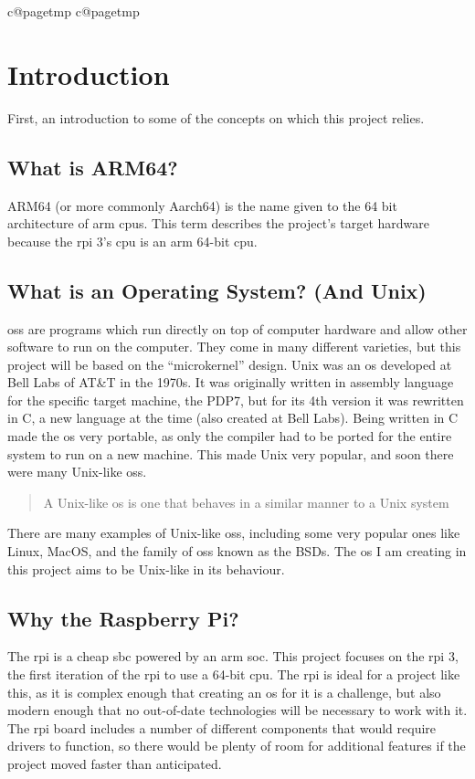 \documentclass{article}
\makeatletter
\newcommand{\mypagenumbering}[1]{%
    \ifcsname c@pagetmp\endcsname
    \else
        \newcounter{pagetmp}
    \fi
    \setcounter{pagetmp}{\value{page}}
    \pagenumbering{#1}
    \setcounter{page}{\value{pagetmp}}
}
\makeatother
\begin{document}
{\mypagenumbering{roman}\hypersetup{hidelinks} \tableofcontents}
\clearpage
\mypagenumbering{arabic}

\section{Introduction}
First, an introduction to some of the concepts on which this project relies.

\subsection{What is ARM64?}
ARM64 (or more commonly Aarch64) is the name given to the 64 bit architecture
of \gls{arm} \glspl{cpu}. This term describes the project's target hardware
because the \gls{rpi} 3's \gls{cpu} is an \gls{arm} 64-bit \gls{cpu}.

\subsection{What is an Operating System? (And Unix)}
\glspl{os} are programs which run directly on top of computer hardware and
allow other software to run on the computer. They come in many different
varieties, but this project will be based on the ``microkernel'' design. Unix
was an \gls{os} developed at Bell Labs of AT\&T in the 1970s. It was originally
written in assembly language for the specific target machine, the PDP7, but for
its 4th version it was rewritten in C, a new language at the time (also created
at Bell Labs). Being written in C made the \gls{os} very portable, as only the
compiler had to be ported for the entire system to run on a new machine. This
made Unix very popular, and soon there were many Unix-like \glspl{os}.
\blockquote[\cite{unix-like}]{A Unix-like \gls{os} is one that behaves in a
similar manner to a Unix system}.
There are many examples of Unix-like \glspl{os}, including some very popular
ones like Linux, MacOS, and the family of \glspl{os} known as the BSDs. The
\gls{os} I am creating in this project aims to be Unix-like in its behaviour.

\subsection{Why the Raspberry Pi?}
The \gls{rpi} is a cheap \gls{sbc} powered by an \gls{arm} \gls{soc}. This
project focuses on the \gls{rpi} 3, the first iteration of the \gls{rpi} to use
a 64-bit \gls{cpu}. The \gls{rpi} is ideal for a project like this, as it is
complex enough that creating an \gls{os} for it is a challenge, but also modern
enough that no out-of-date technologies will be necessary to work with it. The
\gls{rpi} board includes a number of different components that would require
drivers to function, so there would be plenty of room for additional features
if the project moved faster than anticipated.
\end{document}
